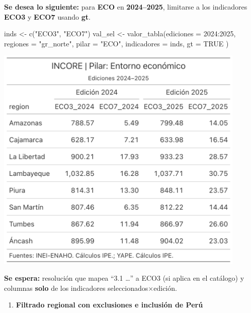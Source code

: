 \documentclass[
  11pt,
  letterpaper,
  DIV=11,
  numbers=noendperiod]{scrartcl}
\newenvironment{Shaded}{\begin{snugshade}}{\end{snugshade}}
\newcommand{\AttributeTok}[1]{\textcolor[rgb]{0.40,0.45,0.13}{#1}}
\newcommand{\ConstantTok}[1]{\textcolor[rgb]{0.56,0.35,0.01}{#1}}
\newcommand{\DecValTok}[1]{\textcolor[rgb]{0.68,0.00,0.00}{#1}}
\newcommand{\FunctionTok}[1]{\textcolor[rgb]{0.28,0.35,0.67}{#1}}
\newcommand{\NormalTok}[1]{\textcolor[rgb]{0.00,0.23,0.31}{#1}}
\newcommand{\OtherTok}[1]{\textcolor[rgb]{0.00,0.23,0.31}{#1}}
\newcommand{\SpecialCharTok}[1]{\textcolor[rgb]{0.37,0.37,0.37}{#1}}
\newcommand{\StringTok}[1]{\textcolor[rgb]{0.13,0.47,0.30}{#1}}
\providecommand{\tightlist}{%
  \setlength{\itemsep}{0pt}\setlength{\parskip}{0pt}}\usepackage{longtable,booktabs,array}
\begin{document}
\textbf{Se desea lo siguiente:} para \textbf{ECO} en
\textbf{2024--2025}, limitarse a los indicadores \textbf{ECO3} y
\textbf{ECO7} usando \textbf{gt}.

\begin{Shaded}
\begin{Highlighting}[]
\NormalTok{inds    }\OtherTok{\textless{}{-}} \FunctionTok{c}\NormalTok{(}\StringTok{"ECO3"}\NormalTok{, }\StringTok{"ECO7"}\NormalTok{)}
\NormalTok{val\_sel }\OtherTok{\textless{}{-}} \FunctionTok{valor\_tabla}\NormalTok{(}\AttributeTok{ediciones    =} \DecValTok{2024}\SpecialCharTok{:}\DecValTok{2025}\NormalTok{,}
                       \AttributeTok{regiones     =} \StringTok{"gr\_norte"}\NormalTok{,}
                       \AttributeTok{pilar        =} \StringTok{"ECO"}\NormalTok{, }
                       \AttributeTok{indicadores  =}\NormalTok{ inds,}
                       \AttributeTok{gt           =} \ConstantTok{TRUE}
\NormalTok{                       )}
\end{Highlighting}
\end{Shaded}

\begin{center}
\includegraphics[width=0.9\textwidth,height=\textheight]{tabla.png}
\end{center}

\textbf{Se espera:} resolución que mapea ``3.1 \ldots{}'' a ECO3 (si
aplica en el catálogo) y columnas \textbf{solo} de los indicadores
seleccionados×edición.

\begin{enumerate}
\def\labelenumi{\arabic{enumi}.}
\setcounter{enumi}{3}
\tightlist
\item
  \textbf{Filtrado regional con exclusiones e inclusión de Perú}
\end{enumerate}
\end{document}
